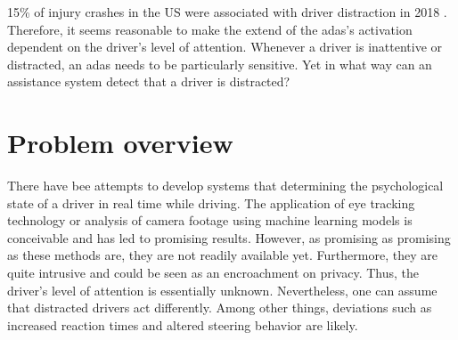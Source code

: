 



15\% of injury crashes in the US were associated with driver distraction in 2018 \parencite{distracted_nhtsa}. Therefore, it seems reasonable to make the extend of the \gls{adas}'s activation dependent on the driver's level of attention. Whenever a driver is inattentive or distracted, an \gls{adas} needs to be particularly sensitive. Yet in what way can an assistance system detect that a driver is distracted? 

\section{Problem overview}


There have bee attempts to develop systems that determining the psychological state of a driver in real time while driving. The application of eye tracking technology or analysis of camera footage using machine learning models is conceivable and has led to promising results. However, as promising as promising as these methods are, they are not readily available yet. Furthermore, they are quite intrusive and could be seen as an encroachment on privacy. Thus, the driver's level of attention is essentially unknown. Nevertheless, one can assume that distracted drivers act differently. Among other things, deviations such as increased reaction times and altered steering behavior are likely.

